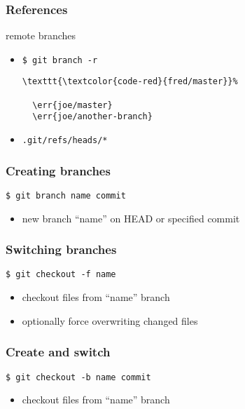 \documentclass[english]{beamer}
\newcommand{\CMD}[1]{%
\texttt{\textcolor{code-green}{#1}}%
}
\newcommand{\cmd}[1]{%
\texttt{\textcolor{code-orange}{#1}}%
}
\newcommand{\err}[1]{%
\texttt{\textcolor{code-red}{#1}}%
}
\newcommand{\fnt}[1]{%
\texttt{\textcolor{code-gray}{#1}}%
}
\newcommand{\faint}[1]{%
\textcolor{code-gray}{#1}%
}
\begin{document}
\begin{frame}[fragile]
\frametitle{References}
remote branches
\begin{itemize}
        \item \CMD{\$ git branch -r} \\
                {\small
                \begin{Verbatim}[commandchars=\\\{\}]
  \err{fred/master}
  \err{joe/master}
  \err{joe/another-branch}
                \end{Verbatim}
                }
        \item \cmd{.git/refs/heads/*}
\end{itemize}
\end{frame}

\begin{frame}
\frametitle{Creating branches}

\CMD{\$ git branch name \fnt{commit}}
\begin{itemize}
        \item new branch ``name'' on HEAD \faint{or specified} commit
\end{itemize}

\end{frame}

\begin{frame}
\frametitle{Switching branches}

\CMD{\$ git checkout \fnt{-f} name}
\begin{itemize}
        \item checkout files from ``name'' branch
        \item \faint{optionally} force overwriting changed files
\end{itemize}

\end{frame}

\begin{frame}
\frametitle{Create and switch}

\CMD{\$ git checkout -b name \fnt{commit}}
\begin{itemize}
        \item checkout files from ``name'' branch
\end{itemize}

\end{frame}
\end{document}

